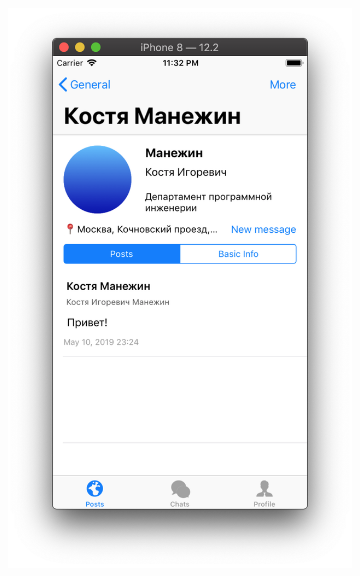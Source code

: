\documentclass[a4paper,12pt]{article}
\begin{document}
	\begin{figure}[h!]
	\centering
	\begin{subfigure}[b]{0.3\linewidth}
		\includegraphics[width=\linewidth]{../includes/pmi/otherprofile.png}
	\end{subfigure}
	\begin{subfigure}[b]{0.3\linewidth}

\end{subfigure}
\end{figure}
\end{document}
